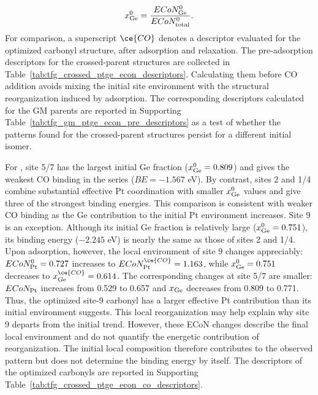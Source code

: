\begin{equation}
x_{\rm Ge}^{0}=\frac{ECoN_{\rm Ge}^{0}}{ECoN_{\rm total}^{0}}.
\end{equation}
For comparison, a superscript $\ce{CO}$ denotes a descriptor evaluated for
the optimized carbonyl structure, after adsorption and relaxation.
The pre-adsorption descriptors for the crossed-parent structures are
collected in Table~\ref{tab:tfg_crossed_ptge_econ_descriptors}. Calculating
them before CO addition avoids mixing the initial site environment with the
structural reorganization induced by adsorption. 
The corresponding descriptors calculated for
the GM parents are reported in Supporting
Table~\ref{tab:tfg_gm_ptge_econ_pre_descriptors} as a test of whether the
patterns found for the crossed-parent structures persist for a different
initial isomer.

For , site 5/7 has the largest initial Ge fraction
($x_{\rm Ge}^{0}=0.809$) and gives the weakest CO binding in the series
($BE=-1.567$ eV). By contrast, sites 2 and 1/4 combine substantial effective
Pt coordination with smaller $x_{\rm Ge}^{0}$ values and give three of the
strongest binding energies. This comparison is consistent with weaker CO
binding as the Ge contribution to the initial Pt environment increases.
{Site 9 is an exception. Although its initial Ge fraction is relatively
large ($x_{\rm Ge}^{0}=0.751$), its binding energy ($-2.245$ eV) is nearly the same as}
those of sites 2 and 1/4. Upon adsorption, however, the local environment of
site 9 changes appreciably: $ECoN_{\rm Pt}^{0}=0.727$ increases to
$ECoN_{\rm Pt}^{\ce{CO}}=1.163$, while $x_{\rm Ge}^{0}=0.751$ decreases to
$x_{\rm Ge}^{\ce{CO}}=0.614$. The corresponding changes at site 5/7 are
smaller: $ECoN_{\rm Pt}$ increases from 0.529 to 0.657 and $x_{\rm Ge}$
decreases from 0.809 to 0.771. Thus, the optimized site-9 carbonyl has a larger
effective Pt contribution than its initial environment suggests. This local
{reorganization may help explain why site 9 departs from the initial
trend. However, these ECoN changes describe the final local environment and
do not quantify the energetic contribution of reorganization.} The initial
local composition therefore contributes to the observed pattern but does not
determine the binding energy by itself. The descriptors of the optimized
carbonyls are reported in Supporting
Table~\ref{tab:tfg_crossed_ptge_econ_co_descriptors}.

